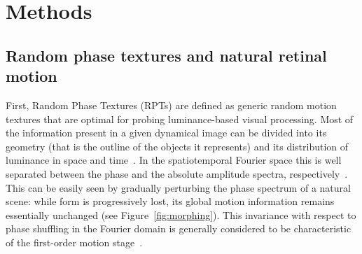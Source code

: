 \documentclass[a4paper,11pt]{article}%
\begin{document}
\section{Methods}\label{section:Methods}
\subsection{Random phase textures and natural retinal motion}\label{subsection:random_phase_textures}
First, Random Phase Textures (RPTs) are defined as generic random motion textures that are optimal for probing luminance-based visual processing. Most of the information present in a given dynamical image can be divided into its geometry (that is the outline of the objects it represents) and its distribution of luminance in space and time~\citep{Neri98,Perrone01,Perrone02,Jasinschi92}. In the spatiotemporal Fourier space this is well separated between the phase and the absolute amplitude spectra, respectively~\citep{Oppenheim81}. This can be easily seen by gradually perturbing the phase spectrum of a natural scene: while form is progressively lost, its global motion information remains essentially unchanged (see Figure~\ref{fig:morphing}). This invariance with respect to phase shuffling in the Fourier domain is generally considered to be characteristic of the first-order motion stage~\citep{Lu01,Derrington04}. 
\end{document}
